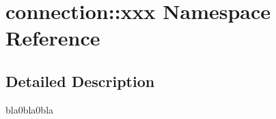 \hypertarget{namespaceconnection_1_1xxx}{}\section{connection\+:\+:xxx Namespace Reference}
\label{namespaceconnection_1_1xxx}


\subsection{Detailed Description}
bla0bla0bla 